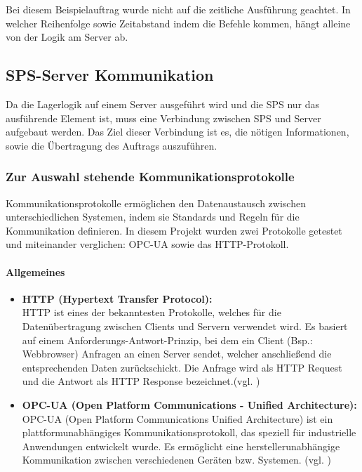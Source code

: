     Bei diesem Beispielauftrag wurde nicht auf die zeitliche Ausführung geachtet. In welcher Reihenfolge sowie Zeitabstand indem die Befehle kommen, hängt alleine von der Logik am Server ab.

\subsection{SPS-Server Kommunikation}
Da die Lagerlogik auf einem Server ausgeführt wird und die SPS nur das ausführende Element ist, muss eine Verbindung zwischen SPS und Server aufgebaut werden. Das Ziel dieser Verbindung ist es, die nötigen Informationen, sowie die Übertragung des Auftrags auszuführen. 

    \subsubsection{Zur Auswahl stehende Kommunikationsprotokolle} 
    \label{Kommunikationsprotokolle}

    Kommunikationsprotokolle ermöglichen den Datenaustausch zwischen unterschiedlichen Systemen, indem sie Standards und Regeln für die Kommunikation definieren. In diesem Projekt wurden zwei Protokolle getestet und miteinander verglichen: OPC-UA sowie das HTTP-Protokoll.


    \paragraph{Allgemeines}

        \begin{itemize}
            \item \textbf{HTTP (Hypertext Transfer Protocol):}  \mbox{} \\
            HTTP ist eines der bekanntesten Protokolle, welches für die Datenübertragung zwischen Clients und Servern verwendet wird. Es basiert auf einem Anforderungs-Antwort-Prinzip, bei dem ein Client (Bsp.: Webbrowser) Anfragen an einen Server sendet, welcher anschließend die entsprechenden Daten zurückschickt. Die Anfrage wird als HTTP Request und die Antwort als HTTP Response bezeichnet.(vgl. \cite{HTTP-Allgemein})
            
            \item \textbf{OPC-UA (Open Platform Communications - Unified Architecture):} \mbox{} \\
            OPC-UA (Open Platform Communications Unified Architecture) ist ein plattformunabhängiges Kommunikationsprotokoll, das speziell für industrielle Anwendungen entwickelt wurde. Es ermöglicht eine herstellerunabhängige Kommunikation zwischen verschiedenen Geräten bzw. Systemen. (vgl. \cite{OPC-UA})
        \end{itemize}


